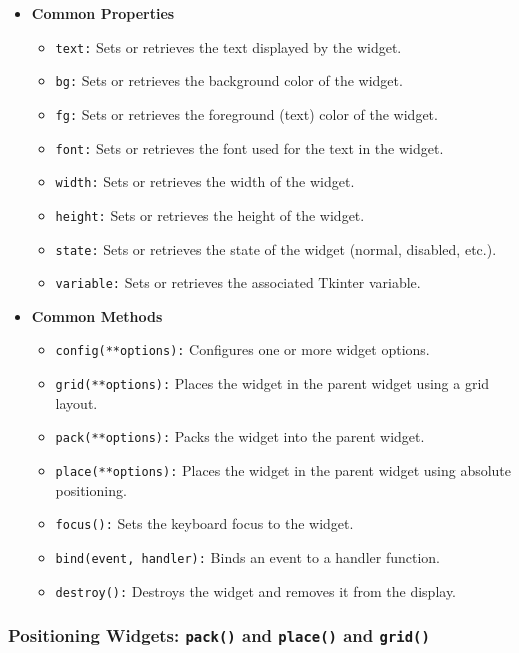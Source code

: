 \begin{itemize}
    \item \textbf{Common Properties}
    \begin{itemize}[label={--}]
        \item \texttt{text:} Sets or retrieves the text displayed by the widget.
        \item \texttt{bg:} Sets or retrieves the background color of the widget.
        \item \texttt{fg:} Sets or retrieves the foreground (text) color of the widget.
        \item \texttt{font:} Sets or retrieves the font used for the text in the widget.
        \item \texttt{width:} Sets or retrieves the width of the widget.
        \item \texttt{height:} Sets or retrieves the height of the widget.
        \item \texttt{state:} Sets or retrieves the state of the widget (normal, disabled, etc.).
        \item \texttt{variable:} Sets or retrieves the associated Tkinter variable.
    \end{itemize}

    \item \textbf{Common Methods}
    \begin{itemize}[label={--}]
        \item \texttt{config(**options):} Configures one or more widget options.
        \item \texttt{grid(**options):} Places the widget in the parent widget using a grid layout.
        \item \texttt{pack(**options):} Packs the widget into the parent widget.
        \item \texttt{place(**options):} Places the widget in the parent widget using absolute positioning.
        \item \texttt{focus():} Sets the keyboard focus to the widget.
        \item \texttt{bind(event, handler):} Binds an event to a handler function.
        \item \texttt{destroy():} Destroys the widget and removes it from the display.
    \end{itemize}
\end{itemize}


\newpage
\subsubsection{Positioning Widgets: \texttt{pack()} and \texttt{place()} and \texttt{grid()}}

